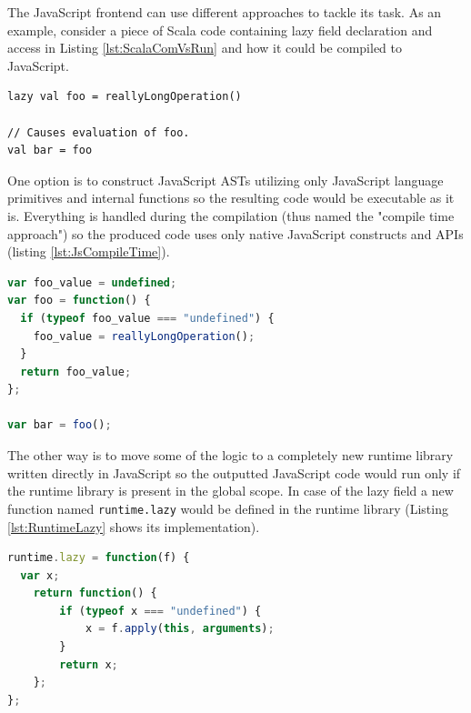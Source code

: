\documentclass[12pt,a4paper]{report}
\begin{document}
The JavaScript frontend can use different approaches to tackle its task. As an example, consider a piece of Scala code containing lazy field declaration and access in Listing \ref{lst:ScalaComVsRun} and how it could be compiled to JavaScript.

\begin{minipage}{\linewidth}
\begin{lstlisting}[caption={Lazy field declaration and access.},label={lst:ScalaComVsRun}]
lazy val foo = reallyLongOperation()

// Causes evaluation of foo.
val bar = foo 
\end{lstlisting}
\end{minipage}

One option is to construct JavaScript ASTs utilizing only JavaScript language primitives and internal functions so the resulting code would be executable as it is. Everything is handled during the compilation (thus named the "compile time approach") so the produced code uses only native JavaScript constructs and APIs (listing \ref{lst:JsCompileTime}).

\begin{minipage}{\linewidth}
\begin{lstlisting}[language=JavaScript,caption={Compile time option outcome.},label={lst:JsCompileTime}]
var foo_value = undefined;
var foo = function() {
  if (typeof foo_value === "undefined") {
    foo_value = reallyLongOperation();
  }
  return foo_value;
};

var bar = foo();
\end{lstlisting} 
\end{minipage}

The other way is to move some of the logic to a completely new runtime library written directly in JavaScript so the outputted JavaScript code would run only if the runtime library is present in the global scope. In case of the lazy field a new function named \texttt{runtime.lazy} would be defined in the runtime library (Listing \ref{lst:RuntimeLazy} shows its implementation).

\begin{minipage}{\linewidth}
\begin{lstlisting}[language=JavaScript,caption={Runtime function that lazifies evaluation.},label={lst:RuntimeLazy}]
runtime.lazy = function(f) {
  var x;
	return function() {
		if (typeof x === "undefined") {
			x = f.apply(this, arguments);
		}
		return x;
	};
};
\end{lstlisting}
\end{minipage}
\end{document}
